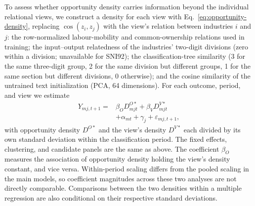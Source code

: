 \documentclass[9pt,twocolumn,twoside]{pnas-new}
\begin{document}
To assess whether opportunity density carries information beyond the individual relational views, we construct a density for each view with Eq.~\eqref{eq:opportunity-density}, replacing $\cos(z_i,z_j)$ with the view's relation between industries $i$ and $j$: the row-normalized labour-mobility and common-ownership relations used in training; the input--output relatedness of the industries' two-digit divisions (zero within a division; unavailable for SNI92); the classification-tree similarity (3 for the same three-digit group, 2 for the same division but different groups, 1 for the same section but different divisions, 0 otherwise); and the cosine similarity of the untrained text initialization (PCA, 64 dimensions). For each outcome, period, and view we estimate
\begin{equation}
\begin{split}
Y_{mj,t+1}={}&\beta_O D^{O*}_{mjt}+\beta_V D^{V*}_{mjt}\\
&+\alpha_{mt}+\gamma_j+\varepsilon_{mj,t+1},
\end{split}
\label{eq:regional-multiple}
\end{equation}
with opportunity density $D^{O*}$ and the view's density $D^{V*}$ each divided by its own standard deviation within the classification period. The fixed effects, clustering, and candidate panels are the same as above. The coefficient $\beta_O$ measures the association of opportunity density holding the view's density constant, and vice versa. Within-period scaling differs from the pooled scaling in the main models, so coefficient magnitudes across these two analyses are not directly comparable. Comparisons between the two densities within a multiple regression are also conditional on their respective standard deviations.


\showacknow{}
\end{document}
